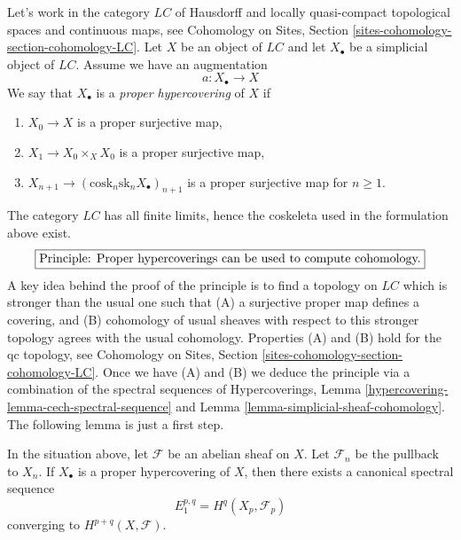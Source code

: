 \noindent
Let's work in the category $\textit{LC}$ of Hausdorff and locally
quasi-compact topological spaces and continuous maps, see
Cohomology on Sites, Section \ref{sites-cohomology-section-cohomology-LC}.
Let $X$ be an object of $\textit{LC}$ and let $X_\bullet$ be a simplicial
object of $\textit{LC}$. Assume we have an augmentation
$$
a : X_\bullet \to X
$$
We say that $X_\bullet$ is a {\it proper hypercovering} of $X$ if
\begin{enumerate}
\item $X_0 \to X$ is a proper surjective map,
\item $X_1 \to X_0 \times_X X_0$ is a proper surjective map,
\item $X_{n + 1} \to (\text{cosk}_n\text{sk}_n X_\bullet)_{n + 1}$
is a proper surjective map for $n \geq 1$.
\end{enumerate}
The category $\textit{LC}$ has all finite limits, hence the
coskeleta used in the formulation above exist.
$$
\fbox{Principle: Proper hypercoverings can be used to compute cohomology.}
$$
A key idea behind the proof of the principle is to find a topology
on $\textit{LC}$ which is stronger than the usual one such that
(A) a surjective proper map defines a covering, and
(B) cohomology of usual sheaves with respect to this stronger
topology agrees with the usual cohomology.
Properties (A) and (B) hold for the qc topology, see
Cohomology on Sites, Section \ref{sites-cohomology-section-cohomology-LC}.
Once we have (A) and (B) we deduce the principle via
a combination of the spectral sequences of
Hypercoverings, Lemma \ref{hypercovering-lemma-cech-spectral-sequence}
and
Lemma \ref{lemma-simplicial-sheaf-cohomology}.
The following lemma is just a first step.

\begin{lemma}
\label{lemma-spectral-sequence-proper-hypercovering}
In the situation above, let $\mathcal{F}$ be an abelian sheaf
on $X$. Let $\mathcal{F}_n$ be the pullback to $X_n$.
If $X_\bullet$ is a proper hypercovering of $X$, then
there exists a canonical spectral sequence
$$
E_1^{p, q} = H^q(X_p, \mathcal{F}_p)
$$
converging to $H^{p + q}(X, \mathcal{F})$.
\end{lemma}

